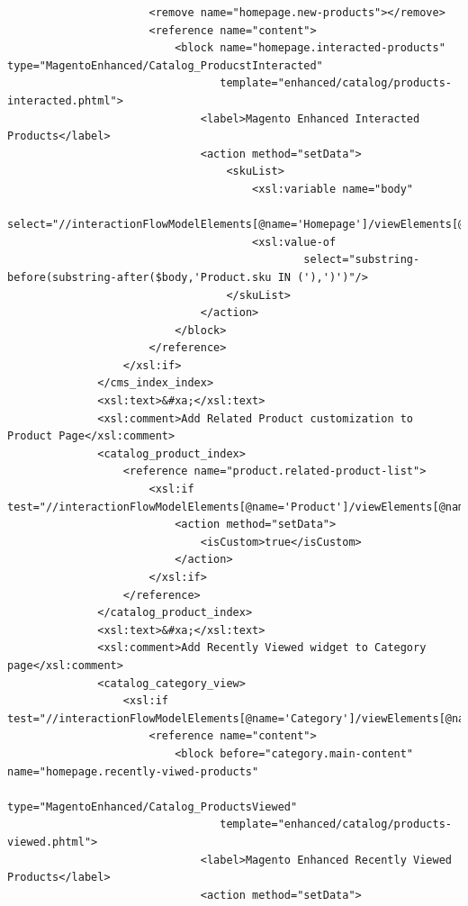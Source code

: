 \begin{lstlisting}
                      <remove name="homepage.new-products"></remove>
                      <reference name="content">
                          <block name="homepage.interacted-products" type="MagentoEnhanced/Catalog_ProducstInteracted"
                                 template="enhanced/catalog/products-interacted.phtml">
                              <label>Magento Enhanced Interacted Products</label>
                              <action method="setData">
                                  <skuList>
                                      <xsl:variable name="body"
                                                    select="//interactionFlowModelElements[@name='Homepage']/viewElements[@name='RecentlyInteractedProducts']/viewComponentParts/subViewComponentParts/@body"/>
                                      <xsl:value-of
                                              select="substring-before(substring-after($body,'Product.sku IN ('),')')"/>
                                  </skuList>
                              </action>
                          </block>
                      </reference>
                  </xsl:if>
              </cms_index_index>
              <xsl:text>&#xa;</xsl:text>
              <xsl:comment>Add Related Product customization to Product Page</xsl:comment>
              <catalog_product_index>
                  <reference name="product.related-product-list">
                      <xsl:if test="//interactionFlowModelElements[@name='Product']/viewElements[@name='RelatedProductList']/viewComponentParts[@name='Product']/subViewComponentParts[@xsi:type='core:ConditionalExpression']">
                          <action method="setData">
                              <isCustom>true</isCustom>
                          </action>
                      </xsl:if>
                  </reference>
              </catalog_product_index>
              <xsl:text>&#xa;</xsl:text>
              <xsl:comment>Add Recently Viewed widget to Category page</xsl:comment>
              <catalog_category_view>
                  <xsl:if test="//interactionFlowModelElements[@name='Category']/viewElements[@name='RecentlyViewedProducts']">
                      <reference name="content">
                          <block before="category.main-content" name="homepage.recently-viwed-products"
                                 type="MagentoEnhanced/Catalog_ProductsViewed"
                                 template="enhanced/catalog/products-viewed.phtml">
                              <label>Magento Enhanced Recently Viewed Products</label>
                              <action method="setData">

\end{lstlisting}
